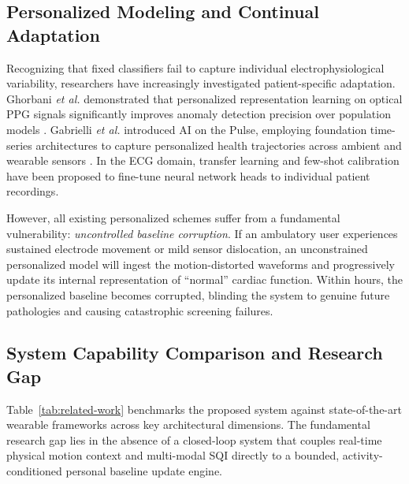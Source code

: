 \documentclass{ieeeaccess}
\begin{document}
\subsection{Personalized Modeling and Continual Adaptation}
Recognizing that fixed classifiers fail to capture individual electrophysiological variability, researchers have increasingly investigated patient-specific adaptation. Ghorbani \textit{et al.} demonstrated that personalized representation learning on optical PPG signals significantly improves anomaly detection precision over population models \cite{ref:ppgpersonal}. Gabrielli \textit{et al.} introduced AI on the Pulse, employing foundation time-series architectures to capture personalized health trajectories across ambient and wearable sensors \cite{ref:pulse}. In the ECG domain, transfer learning and few-shot calibration have been proposed to fine-tune neural network heads to individual patient recordings. 

However, all existing personalized schemes suffer from a fundamental vulnerability: \textit{uncontrolled baseline corruption}. If an ambulatory user experiences sustained electrode movement or mild sensor dislocation, an unconstrained personalized model will ingest the motion-distorted waveforms and progressively update its internal representation of ``normal'' cardiac function. Within hours, the personalized baseline becomes corrupted, blinding the system to genuine future pathologies and causing catastrophic screening failures.

\subsection{System Capability Comparison and Research Gap}
Table~\ref{tab:related-work} benchmarks the proposed system against state-of-the-art wearable frameworks across key architectural dimensions. The fundamental research gap lies in the absence of a closed-loop system that couples real-time physical motion context and multi-modal SQI directly to a bounded, activity-conditioned personal baseline update engine.
\end{document}

